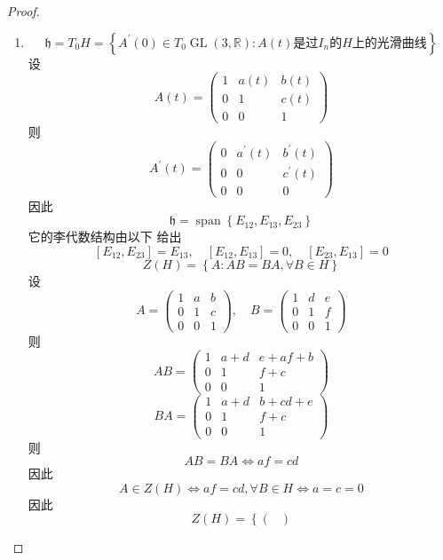 \documentclass[../main.tex]{subfiles}
\begin{document}
\begin{proof}
  \begin{enumerate}
    \item  \[
    \mathfrak{h}= T_{0}H= \left\{ A^{\prime} \left( 0 \right) \in T_0\operatorname{GL} \left( 3,\mathbb{R}  \right) : A\left( t \right) \text{是过} I_{n}\text{的}H\text{上的光滑曲线} \right\}
    \]设 \[
    A\left( t \right)= \begin{pmatrix} 
        1&a\left( t \right)&b\left( t \right)\\ 
         0&1&c\left( t \right)\\ 
          0&0&1    
    \end{pmatrix}  
    \]则 \[
    A^{\prime} \left( t \right)= \begin{pmatrix} 
        0&a^{\prime} \left( t \right)&b^{\prime} \left( t \right)\\ 
         0&0&c^{\prime} \left( t \right)\\ 
          0&0&0    
    \end{pmatrix}  
    \]因此 \[
    \mathfrak{h}= \operatorname{span}\left\{ E_{12} , E_{13}, E_{23}\right\}
    \]它的李代数结构由以下 给出 \[
    [E_{12},E_{23}]= E_{13},\quad [E_{12}, E_{13}]= 0,\quad [E_{23},E_{13}]= 0
    \] \[
    Z\left( H \right)= \left\{ A: AB= BA, \forall B\in H \right\} 
    \] 设 \[
    A= \begin{pmatrix} 
        1&a&b\\ 
         0&1&c\\ 
          0&0&1 
    \end{pmatrix} ,\quad B= \begin{pmatrix} 
        1&d&e\\ 
         0&1&f\\ 
          0&0&1 
    \end{pmatrix} 
    \]则 \[
    AB= \begin{pmatrix} 
        1&a+ d&e+ af+ b\\ 
         0&1&f+ c\\ 
          0&0&1 
    \end{pmatrix} 
    \] \[
    BA= \begin{pmatrix} 
        1&a+ d&b+ cd+ e\\ 
         0&1&f+ c\\ 
          0&0&1 
    \end{pmatrix} 
    \]则 \[
    AB= BA\iff af= cd
    \]因此 \[
    A\in Z\left( H \right)\iff af= cd,\forall B \in H\iff a= c= 0 
    \]因此 \[
    Z\left( H \right)= \left\{ \begin{pmatrix} 

\end{pmatrix}\]
\end{enumerate}
\end{proof}
\end{document}
